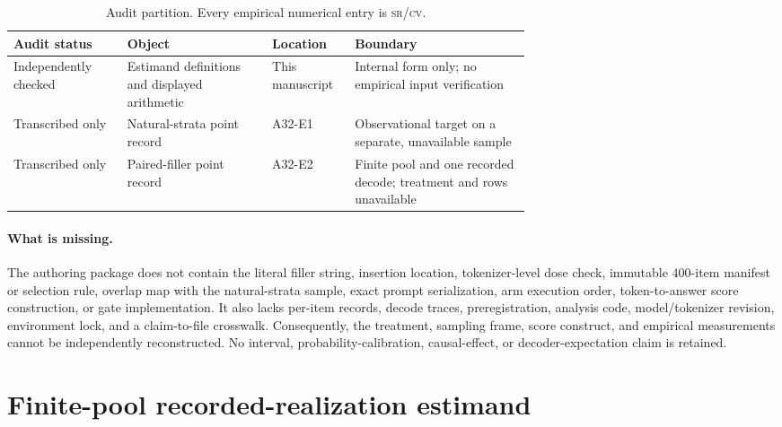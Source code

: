 \documentclass{article}
\newcommand{\srcv}{\textsc{sr/cv}}
\begin{document}
\begin{table}[H]
\centering
\caption{Audit partition.  Every empirical numerical entry is \srcv{}.}
\label{tab:hierarchy}
\small
\begin{tabularx}{\linewidth}{@{}p{0.22\linewidth}p{0.29\linewidth}p{0.16\linewidth}X@{}}
\toprule
Audit status & Object & Location & Boundary \\
\midrule
Independently checked & Estimand definitions and displayed arithmetic & This manuscript & Internal form only; no empirical input verification \\
Transcribed only & Natural-strata point record & A32-E1 & Observational target on a separate, unavailable sample \\
Transcribed only & Paired-filler point record & A32-E2 & Finite pool and one recorded decode; treatment and rows unavailable \\
\bottomrule
\end{tabularx}
\normalsize
\end{table}

\paragraph{What is missing.}
The authoring package does not contain the literal filler string, insertion location,
tokenizer-level dose check, immutable $400$-item manifest or selection rule, overlap
map with the natural-strata sample, exact prompt serialization, arm execution order,
token-to-answer score construction, or gate implementation.  It also lacks per-item
records, decode traces, preregistration, analysis code, model/tokenizer revision,
environment lock, and a claim-to-file crosswalk.  Consequently, the treatment,
sampling frame, score construct, and empirical measurements cannot be independently
reconstructed.  No interval, probability-calibration, causal-effect, or
decoder-expectation claim is retained.

\section{Finite-pool recorded-realization estimand}
\label{sec:estimand}
\end{document}
